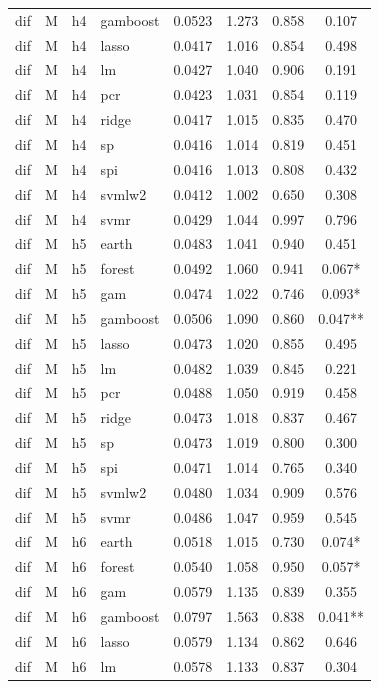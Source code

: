\begin{ThreePartTable}
\begin{longtable}[t]{llclcccc}
dif & M & h4 & gamboost & 0.0523 & 1.273 & 0.858 & 0.107\\
dif & M & h4 & lasso & 0.0417 & 1.016 & 0.854 & 0.498\\
dif & M & h4 & lm & 0.0427 & 1.040 & 0.906 & 0.191\\
dif & M & h4 & pcr & 0.0423 & 1.031 & 0.854 & 0.119\\
dif & M & h4 & ridge & 0.0417 & 1.015 & 0.835 & 0.470\\
dif & M & h4 & sp & 0.0416 & 1.014 & 0.819 & 0.451\\
dif & M & h4 & spi & 0.0416 & 1.013 & 0.808 & 0.432\\
dif & M & h4 & svmlw2 & 0.0412 & 1.002 & 0.650 & 0.308\\
dif & M & h4 & svmr & 0.0429 & 1.044 & 0.997 & 0.796\\
\addlinespace
dif & M & h5 & earth & 0.0483 & 1.041 & 0.940 & 0.451\\
dif & M & h5 & forest & 0.0492 & 1.060 & 0.941 & 0.067*\\
dif & M & h5 & gam & 0.0474 & 1.022 & 0.746 & 0.093*\\
dif & M & h5 & gamboost & 0.0506 & 1.090 & 0.860 & 0.047**\\
dif & M & h5 & lasso & 0.0473 & 1.020 & 0.855 & 0.495\\
dif & M & h5 & lm & 0.0482 & 1.039 & 0.845 & 0.221\\
dif & M & h5 & pcr & 0.0488 & 1.050 & 0.919 & 0.458\\
dif & M & h5 & ridge & 0.0473 & 1.018 & 0.837 & 0.467\\
dif & M & h5 & sp & 0.0473 & 1.019 & 0.800 & 0.300\\
dif & M & h5 & spi & 0.0471 & 1.014 & 0.765 & 0.340\\
dif & M & h5 & svmlw2 & 0.0480 & 1.034 & 0.909 & 0.576\\
dif & M & h5 & svmr & 0.0486 & 1.047 & 0.959 & 0.545\\
\addlinespace
dif & M & h6 & earth & 0.0518 & 1.015 & 0.730 & 0.074*\\
dif & M & h6 & forest & 0.0540 & 1.058 & 0.950 & 0.057*\\
dif & M & h6 & gam & 0.0579 & 1.135 & 0.839 & 0.355\\
dif & M & h6 & gamboost & 0.0797 & 1.563 & 0.838 & 0.041**\\
dif & M & h6 & lasso & 0.0579 & 1.134 & 0.862 & 0.646\\
dif & M & h6 & lm & 0.0578 & 1.133 & 0.837 & 0.304\\

\end{longtable}
\end{ThreePartTable}
